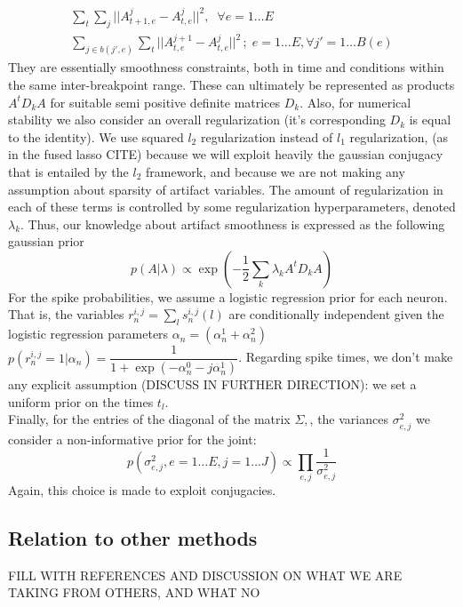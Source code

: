 \documentclass[12pt,letterpaper,fleqn]{article}
\begin{document}
\begin{eqnarray}
\nonumber \sum_t\sum_j ||A_{t+1,e}^j-A_{t,e}^j||^2,\;\;\forall e=1\ldots E \\
\nonumber \sum_{j\in b(j',e)}\sum_t ||A_{t,e}^{j+1}-A_{t,e}^j||^2\,;\; e=1\ldots E,\forall j' =1\ldots B(e)
\end{eqnarray}
They are essentially smoothness constraints, both in time and conditions within the same inter-breakpoint range. These can ultimately be represented as products $A^tD_kA$ for suitable semi positive definite matrices $D_k$. Also, for numerical stability we also consider an overall regularization (it's corresponding $D_k$ is equal to the identity). We use squared $l_2$ regularization instead of $l_1$ regularization, (as in the fused lasso CITE) because we will exploit heavily the gaussian conjugacy that is entailed by the $l_2$ framework, and because we are not making any assumption about sparsity of artifact variables. The amount of regularization in each of these terms is controlled by some regularization hyperparameters, denoted $\lambda_k$. Thus, our knowledge about artifact smoothness is expressed as the following gaussian prior
$$p(A|\lambda)\propto \exp\left(-\dfrac{1}{2} \sum_k \lambda_k A^tD_kA\right)$$
For the spike probabilities, we assume a logistic regression prior for each neuron. That is, the variables  $r_n^{i,j}=\sum_{l}s_n^{i,j}(l)$ are conditionally independent given the logistic regression parameters $\alpha_n=(\alpha_n^1+\alpha_n^2)$ 
$p(r_n^{i,j}=1|\alpha_n)=\dfrac{1}{1+\exp\left(-\alpha^0_n-j\alpha^1_n  \right)}$. Regarding spike times, we don't make any explicit assumption (DISCUSS IN FURTHER DIRECTION): we set a uniform prior on the times $t_{l}$. \\
Finally, for the entries of the diagonal of the matrix $\Sigma,$, the variances $\sigma^2_{e,j}$ we consider a non-informative prior for the joint: $$p(\sigma^2_{e,j},e=1\ldots E,j=1\ldots J)\propto \prod_{e,j} \frac{1}{\sigma^2_{e,j}}$$
Again, this choice is made to exploit conjugacies.
\subsection{Relation to other methods}
FILL WITH REFERENCES AND DISCUSSION ON WHAT WE ARE TAKING FROM OTHERS, AND WHAT NO
\end{document}
